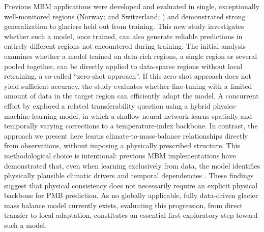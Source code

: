 \documentclass[draft]{agujournal2019}
\begin{document}
Previous MBM applications were developed and evaluated in single, exceptionally well-monitored regions (Norway; \citealp{Sjursen2025} and Switzerland; \citealp{vanderMeer_2026}) and demonstrated strong generalization to glaciers held out from training. This new study investigates whether such a model, once trained, can also generate reliable predictions in entirely different regions not encountered during training. The initial analysis examines whether a model trained on data-rich regions, a single region or several pooled together, can be directly applied to data-sparse regions without local retraining, a so-called ``zero-shot approach''. If this zero-shot approach does not yield sufficient accuracy, the study evaluates whether fine-tuning with a limited amount of data in the target region can efficiently adapt the model. A concurrent effort by \citet{Maslov_2026} explored a related transferability question using a hybrid physics-machine-learning model, in which a shallow neural network learns spatially and temporally varying corrections to a temperature-index backbone. In contrast, the approach we present here learns climate-to-mass-balance relationships directly from observations, without imposing a physically prescribed structure. This methodological choice is intentional: previous MBM implementations have demonstrated that, even when learning exclusively from data, the model identifies physically plausible climatic drivers and temporal dependencies \citep{Sjursen2025, vanderMeer_2026}. These findings suggest that physical consistency does not necessarily require an explicit physical backbone for PMB prediction. As no globally applicable, fully data-driven glacier mass balance model currently exists, evaluating this progression, from direct transfer to local adaptation, constitutes an essential first exploratory step toward such a model. 
\end{document}
